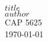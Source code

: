\begin{titlepage}
    \begin{center}
      \textbf{\Huge $title$}\\[1cm]
      \Large $author$\\[1.25cm]
      \normalsize CAP 5625\\[0.75cm]
      \today
    \end{center}
\end{titlepage}
